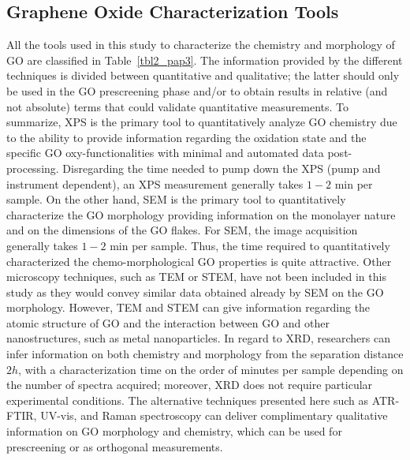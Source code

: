 \subsection{Graphene Oxide Characterization Tools}
All the tools used in this study to characterize the chemistry and morphology of GO are classified in Table~\ref{tbl2_pap3}. The information provided by the different techniques is divided between quantitative and qualitative; the latter should only be used in the GO prescreening phase and/or to obtain results in relative (and not absolute) terms that could validate quantitative measurements. To summarize, XPS is the primary tool to quantitatively analyze GO chemistry due to the ability to provide information regarding the oxidation state and the specific GO oxy-functionalities with minimal and automated data post-processing. Disregarding the time needed to pump down the XPS (pump and instrument dependent), an XPS measurement generally takes $1-2$ min per sample. On the other hand, SEM is the primary tool to quantitatively characterize the GO morphology providing information on the monolayer nature and on the dimensions of the GO flakes. For SEM, the image acquisition generally takes $1-2$ min per sample. Thus, the time required to quantitatively characterized the chemo-morphological GO properties is quite attractive. Other microscopy techniques, such as TEM or STEM, have not been included in this study as they would convey similar data obtained already by SEM on the GO morphology. However, TEM and STEM can give information regarding the atomic structure of GO\cite{dave2016chemistry} and the interaction between GO and other nanostructures, such as metal nanoparticles.\cite{shao2015preparation} In regard to XRD, researchers can infer information on both chemistry and morphology from the separation distance $2h$, with a characterization time on the order of minutes per sample depending on the number of spectra acquired; moreover, XRD does not require particular experimental conditions. The alternative techniques presented here such as ATR-FTIR, UV-vis, and Raman spectroscopy can deliver complimentary qualitative information on GO morphology and chemistry, which can be used for prescreening or as orthogonal measurements.
